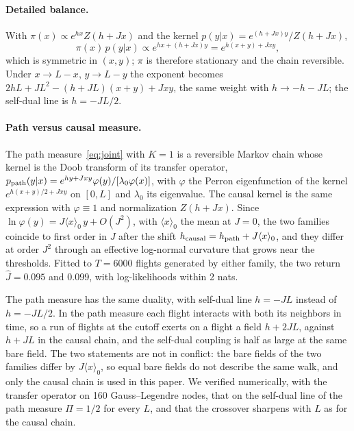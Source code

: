 \paragraph{Detailed balance.} With $\pi(x)\propto e^{hx}Z(h+Jx)$ and the kernel $p(y|x)=e^{(h+Jx)y}/Z(h+Jx)$,
\begin{equation}
\pi(x)\,p(y|x)\propto e^{hx+(h+Jx)y}=e^{h(x+y)+Jxy},
\end{equation}
which is symmetric in $(x,y)$; $\pi$ is therefore stationary and the chain reversible. Under $x\to L-x$, $y\to L-y$ the exponent becomes $2hL+JL^2-(h+JL)(x+y)+Jxy$, the same weight with $h\to-h-JL$; the self-dual line is $h=-JL/2$.

\paragraph{Path versus causal measure.} The path measure~\eqref{eq:joint} with $K=1$ is a reversible Markov chain whose kernel is the Doob transform of its transfer operator, $p_{\rm path}(y|x)=e^{hy+Jxy}\varphi(y)/[\lambda_0\varphi(x)]$, with $\varphi$ the Perron eigenfunction of the kernel $e^{h(x+y)/2+Jxy}$ on $[0,L]$ and $\lambda_0$ its eigenvalue. The causal kernel is the same expression with $\varphi\equiv1$ and normalization $Z(h+Jx)$. Since $\ln\varphi(y)=J\langle x\rangle_0\,y+O(J^2)$, with $\langle x\rangle_0$ the mean at $J=0$, the two families coincide to first order in $J$ after the shift $h_{\rm causal}=h_{\rm path}+J\langle x\rangle_0$, and they differ at order $J^2$ through an effective log-normal curvature that grows near the thresholds. Fitted to $T=6000$ flights generated by either family, the two return $\hat J=0.095$ and 0.099, with log-likelihoods within 2 nats.

The path measure has the same duality, with self-dual line $h=-JL$ instead of $h=-JL/2$. In the path measure each flight interacts with both its neighbors in time, so a run of flights at the cutoff exerts on a flight a field $h+2JL$, against $h+JL$ in the causal chain, and the self-dual coupling is half as large at the same bare field. The two statements are not in conflict: the bare fields of the two families differ by $J\langle x\rangle_0$, so equal bare fields do not describe the same walk, and only the causal chain is used in this paper. We verified numerically, with the transfer operator on 160 Gauss--Legendre nodes, that on the self-dual line of the path measure $\Pi=1/2$ for every $L$, and that the crossover sharpens with $L$ as for the causal chain.

